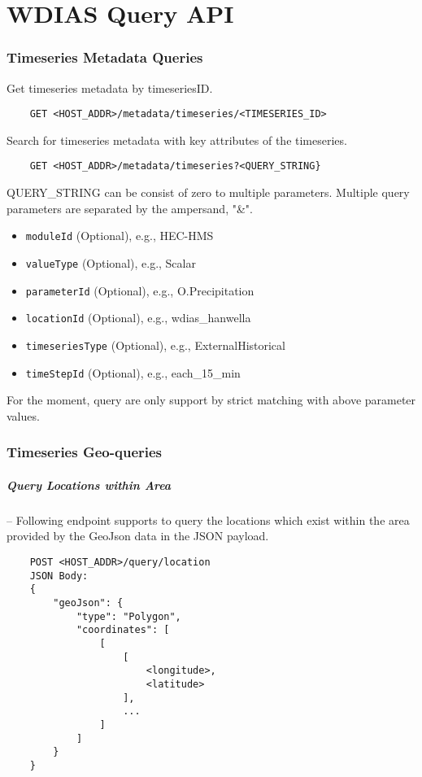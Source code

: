 \chapter{WDIAS Query API}

\subsection{Timeseries Metadata Queries}
Get timeseries metadata by timeseriesID.
\begin{lstlisting}
    GET <HOST_ADDR>/metadata/timeseries/<TIMESERIES_ID>
\end{lstlisting}

Search for timeseries metadata with key attributes of the timeseries.
\begin{lstlisting}
    GET <HOST_ADDR>/metadata/timeseries?<QUERY_STRING}
\end{lstlisting}

QUERY\_STRING can be consist of zero to multiple parameters. Multiple query parameters are separated by the ampersand, "\&".
\begin{itemize}
    \item \texttt{moduleId} (Optional), e.g., HEC-HMS
    \item \texttt{valueType} (Optional), e.g., Scalar
    \item \texttt{parameterId} (Optional), e.g., O.Precipitation
    \item \texttt{locationId} (Optional), e.g., wdias\_hanwella
    \item \texttt{timeseriesType} (Optional), e.g., ExternalHistorical
    \item \texttt{timeStepId} (Optional), e.g., each\_15\_min
\end{itemize}
For the moment, query are only support by strict matching with above parameter values.

\subsection{Timeseries Geo-queries}

\paragraph{Query Locations within Area}-- Following endpoint supports to query the locations which exist within the area provided by the GeoJson data in the JSON payload.
\begin{lstlisting}
    POST <HOST_ADDR>/query/location
    JSON Body:
    {
        "geoJson": {
            "type": "Polygon",
            "coordinates": [
                [
                    [
                        <longitude>,
                        <latitude>
                    ],
                    ...
                ]
            ]
        }
    }
\end{lstlisting}

